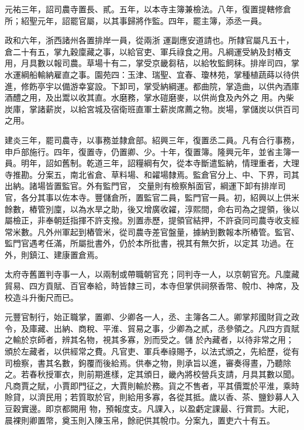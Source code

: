 \begin{pinyinscope}
 元祐三年，詔司農寺置長、貳。五年，以本寺主簿兼檢法。八年，復置提轄修倉所；紹聖元年，詔罷官屬，以其事歸將作監。四年，罷主簿，添丞一員。



 政和六年，浙西諸州各置排岸一員，從兩浙
 運副應安道請也。所隸官屬凡五十，倉二十有五，掌九穀廩藏之事，以給官吏、軍兵祿食之用。凡綱運受納及封樁支用，月具數以報司農。草場十有二，掌受京畿芻秸，以給牧監飼秣。排岸司四，掌水運綱船輸納雇直之事。園苑四：玉津、瑞聖、宜春、瓊林苑，掌種植蔬蒔以待供進，修飭亭宇以備游幸宴設。下卸司，掌受納綱運。都曲院，掌造曲，以供內酒庫酒醴之用，及出鬻以收其直。水磨務，掌水磑磨麥，以供尚食及內外之
 用。內柴炭庫，掌諸薪炭，以給宮城及宿衛班直軍士薪炭席薦之物。炭場，掌儲炭以供百司之用。



 建炎三年，罷司農寺，以事務並隸倉部。紹興三年，復置丞二員。凡有合行事務，申戶部施行。四年，復置寺，仍置卿、少。十年，復置簿。隆興元年，並省主簿一員。明年，詔如舊制。乾道三年，詔糧綱有欠，從本寺斷遣監納，情理重者，大理寺推勘。分案五，南北省倉、草料場、和糴場隸焉。監倉官分上、中、下界，司其出納。諸場皆置監官。外有監門官，
 交量則有檢察斛面官，綱運下卸有排岸司官，各分其事以佐本寺。豐儲倉所，置監官二員，監門官一員。初，紹興以上供米餘數，樁管別廩，以為水旱之助，後又增廣收糴，淳熙間，命右司為之提領，後以屬檢正，非奉朝廷指揮不許支撥。別置赤歷，提領官結押，不許袞同司農寺收支經常米數。凡外州軍起到樁管米，從司農寺差官盤量，據納到數報本所樁管。監官、監門官遇考任滿，所屬批書外，仍於本所批書，視其有無欠折，以定其
 功過。在外，則鎮江、建康置倉焉。



 太府寺舊置判寺事一人，以兩制或帶職朝官充；同判寺一人，以京朝官充。凡廩藏貿易、四方貢賦、百官奉給，時皆隸三司，本寺但掌供祠祭香幣、帨巾、神席，及校造斗升衡尺而已。



 元豐官制行，始正職掌，置卿、少卿各一人，丞、主簿各二人。卿掌邦國財貨之政令，及庫藏、出納、商稅、平淮、貿易之事，少卿為之貳，丞參領之。凡四方貢賦之輸於京師者，辨其名物，視其多寡，別而受之。儲
 於內藏者，以待非常之用；頒於左藏者，以供經常之費。凡官吏、軍兵奉祿賜予，以法式頒之，先給歷，從有司檢察，書其名數，鉤覆而後給焉。供奉之物，則承旨以進，審奏得晝，乃聽除之。若春秋授軍衣，則前期進樣，定其頒日，畿內將校營兵支請，月具其數以聞。凡商賈之賦，小賈即門征之，大賈則輸於務。貨之不售者，平其價鬻於平淮，乘時賒貸，以濟民用；若質取於官，則給用多寡，各從其抵。歲以香、茶、鹽鈔募人入豆穀實邊。即京都闕用
 物，預報度支。凡課入，以盈虧定課最、行賞罰。大祀，晨裸則卿置幣，奠玉則入陳玉帛，餘祀供其帨巾。分案九，置吏六十有五。




\end{pinyinscope}
